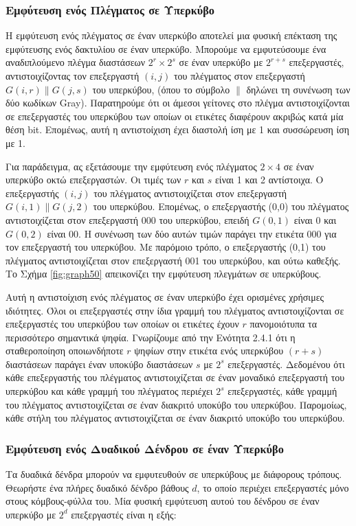 \documentclass[12pt,a4paper]{article}
\begin{document}
\subsubsection{Εμφύτευση ενός Πλέγματος σε Υπερκύβο}
Η εμφύτευση ενός πλέγματος σε έναν υπερκύβο αποτελεί μια φυσική επέκταση 
της εμφύτευσης ενός δακτυλίου σε έναν υπερκύβο. Μπορούμε να εμφυτεύσουμε
ένα αναδιπλούμενο πλέγμα διαστάσεων $2^r \times 2^s$ σε έναν υπερκύβο με 
$2^{r+s}$ επεξεργαστές, αντιστοιχίζοντας τον επεξεργαστή $(i,j)$ του 
πλέγματος στον επεξεργαστή $G(i,r) \parallel G(j,s)$ του υπερκύβου, (όπου το 
σύμβολο $\parallel$ δηλώνει τη συνένωση των δύο κωδίκων \foreignlanguage{english}{Gray}).
Παρατηρούμε ότι οι άμεσοι γείτονες στο πλέγμα αντιστοιχίζονται σε 
επεξεργαστές του υπερκύβου των οποίων οι ετικέτες διαφέρουν ακριβώς κατά 
μία θέση \foreignlanguage{english}{bit}. Επομένως, αυτή η αντιστοίχιση 
έχει διαστολή ίση με 1 και συσσώρευση ίση με 1.

Για παράδειγμα, ας εξετάσουμε την εμφύτευση ενός πλέγματος $2 \times 4$
σε έναν υπερκύβο οκτώ επεξεργαστών. Οι τιμές των $r$ και $s$ είναι 1 και 
2 αντίστοιχα. Ο επεξεργαστής $(i,j)$ του πλέγματος αντιστοιχίζεται στον 
επεξεργαστή $G(i,1)\parallel G(j,2)$ του υπερκύβου. Επομένως, ο 
επεξεργαστής (0,0) του πλέγματος αντιστοιχίζεται στον επεξεργαστή 000 
του υπερκύβου, επειδή $G(0,1)$ είναι 0 και $G(0,2)$ είναι 00. Η συνένωση των δύο αυτών 
τιμών παράγει την ετικέτα 000 για τον επεξεργαστή του υπερκύβου. Με 
παρόμοιο τρόπο, ο επεξεργαστής (0,1) του πλέγματος αντιστοιχίζεται στον 
επεξεργαστή 001 του υπερκύβου, και ούτω καθεξής. Το Σχήμα \ref{fig:graph50}
απεικονίζει την εμφύτευση πλεγμάτων σε υπερκύβους.

Αυτή η αντιστοίχιση ενός πλέγματος σε έναν υπερκύβο έχει ορισμένες 
χρήσιμες ιδιότητες. Όλοι οι επεξεργαστές στην ίδια γραμμή του πλέγματος 
αντιστοιχίζονται σε επεξεργαστές του υπερκύβου των οποίων οι ετικέτες 
έχουν $r$ πανομοιότυπα τα περισσότερο σημαντικά ψηφία. Γνωρίζουμε από την 
Ενότητα 2.4.1 ότι η σταθεροποίηση οποιωνδήποτε $r$ ψηφίων στην ετικέτα 
ενός υπερκύβου $(r+s)$ διαστάσεων παράγει έναν υποκύβο διαστάσεων $s$ με 
$2^s$ επεξεργαστές. Δεδομένου ότι κάθε επεξεργαστής του πλέγματος 
αντιστοιχίζεται σε έναν μοναδικό επεξεργαστή του υπερκύβου και κάθε 
γραμμή του πλέγματος περιέχει $2^s$ επεξεργαστές, κάθε γραμμή του πλέγματος 
αντιστοιχίζεται σε έναν διακριτό υποκύβο του υπερκύβου. Παρομοίως, κάθε 
στήλη του πλέγματος αντιστοιχίζεται σε έναν διακριτό υποκύβο του υπερκύβου.

\subsubsection{Εμφύτευση ενός Δυαδικού Δένδρου σε έναν Υπερκύβο}
Τα δυαδικά δένδρα μπορούν να εμφυτευθούν σε υπερκύβους με διάφορους τρόπους. 
Θεωρήστε ένα πλήρες δυαδικό δένδρο βάθους $d$, το οποίο περιέχει 
επεξεργαστές μόνο στους κόμβους-φύλλα του. Μία φυσική εμφύτευση αυτού του 
δένδρου σε έναν υπερκύβο με $2^d$ επεξεργαστές είναι η εξής:
\end{document}
